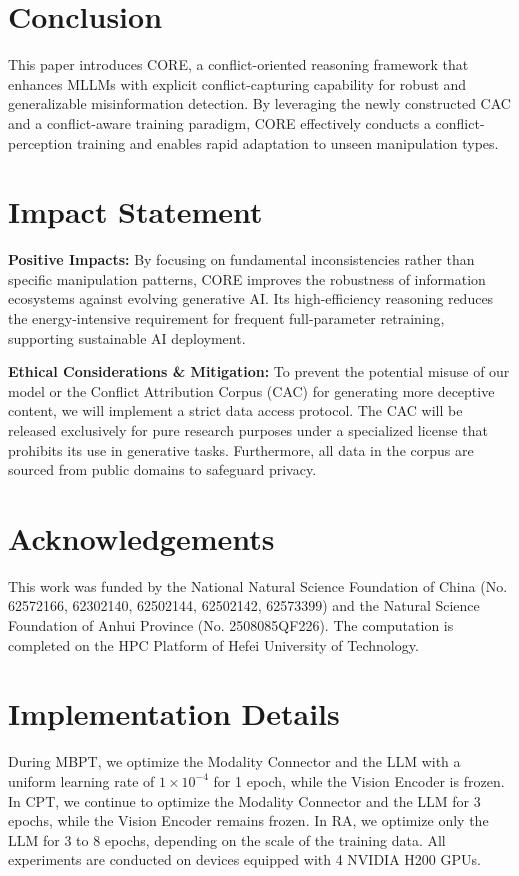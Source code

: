 \documentclass{article}
\theoremstyle{plain}
\theoremstyle{definition}
\theoremstyle{remark}
\begin{document}
\section{Conclusion}
This paper introduces CORE, a conflict-oriented reasoning framework that enhances MLLMs with explicit conflict-capturing capability for robust and generalizable misinformation detection. By leveraging the newly constructed CAC and a conflict-aware training paradigm, CORE effectively conducts a conflict-perception training and enables rapid adaptation to unseen manipulation types.

\section*{Impact Statement}
\textbf{Positive Impacts:} By focusing on fundamental inconsistencies rather than specific manipulation patterns, CORE improves the robustness of information ecosystems against evolving generative AI. Its high-efficiency reasoning reduces the energy-intensive requirement for frequent full-parameter retraining, supporting sustainable AI deployment.

\textbf{Ethical Considerations \& Mitigation:} 
To prevent the potential {misuse} of our model or the Conflict Attribution Corpus (CAC) for generating more deceptive content, we will implement a {strict data access protocol}. The CAC will be released exclusively for {pure research purposes} under a specialized license that prohibits its use in generative tasks. Furthermore,  all data in the corpus are sourced from public domains to safeguard privacy.

\section*{Acknowledgements}
This work was funded by the National Natural Science Foundation of China (No. 62572166, 62302140, 62502144, 62502142, 62573399) and the Natural Science Foundation of Anhui Province (No. 2508085QF226). The computation is completed on the HPC Platform of Hefei University of Technology.




\newpage
\appendix
\onecolumn
\section{Implementation Details}
\label{appendix-implementation_details}
During MBPT, we optimize the Modality Connector and the LLM with a uniform learning rate of $1 \times 10^{-4}$ for 1 epoch, while the Vision Encoder is frozen. In CPT, we continue to optimize the Modality Connector and the LLM for 3 epochs, while the Vision Encoder remains frozen. In RA, we optimize only the LLM for 3 to 8 epochs, depending on the scale of the training data. All experiments are conducted on devices equipped with 4 NVIDIA H200 GPUs.
\end{document}
